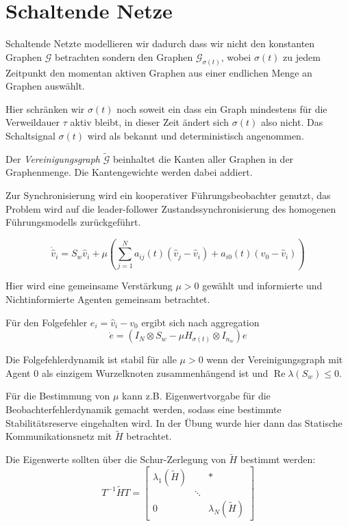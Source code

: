 \pagebreak
\section{Schaltende Netze}

Schaltende Netzte modellieren wir dadurch dass wir nicht den konstanten
Graphen $\mathcal{G}$ betrachten sondern den Graphen $\mathcal{G}_{\sigma(t)}$,
wobei $\sigma(t)$ zu jedem Zeitpunkt den momentan aktiven Graphen
aus einer endlichen Menge an Graphen auswählt.

Hier schränken wir $\sigma(t)$ noch soweit ein dass ein Graph mindestens
für die Verweildauer $\tau$ aktiv bleibt, in dieser Zeit ändert sich
$\sigma(t)$ also nicht.
Das Schaltsignal $\sigma(t)$ wird als bekannt und deterministisch 
angenommen.

Der \emph{Vereinigungsgraph} $\tilde{\mathcal{G}}$ beinhaltet die Kanten
aller Graphen in der Graphenmenge.
Die Kantengewichte werden dabei addiert.

Zur Synchronisierung wird ein kooperativer Führungsbeobachter genutzt,
das Problem wird auf die leader-follower Zustandssynchronisierung
des homogenen Führungsmodells zurückgeführt.

\begin{equation}
    \dot{\hat{v}}_i = S_w \hat{v}_i + \mu \left( \sum_{j=1}^N a_{ij}(t)
    (\hat{v}_j - \hat{v}_i) + a_{i0}(t)(v_0 - \hat{v}_i) \right)   
\end{equation}

Hier wird eine gemeinsame Verstärkung $\mu >0$ gewählt und informierte
und Nichtinformierte Agenten gemeinsam betrachtet.

Für den Folgefehler $e_i = \hat{v}_i - v_0$ ergibt sich nach aggregation
\begin{equation}
    \dot{e} = (I_N \otimes S_w - \mu H_{\sigma(t)} \otimes I_{n_w}) e
\end{equation}

Die Folgefehlerdynamik ist stabil für alle $\mu > 0$ wenn der Vereinigungsgraph
mit Agent 0 als einzigem Wurzelknoten zusammenhängend ist und
$\operatorname{Re}\lambda(S_w) \leq 0$.

Für die Bestimmung von $\mu$ kann z.B. Eigenwertvorgabe für die
Beobachterfehlerdynamik gemacht werden, sodass eine bestimmte
Stabilitätsreserve eingehalten wird.
In der Übung wurde hier dann das Statische Kommunikationsnetz
mit $\tilde{H}$ betrachtet.

Die Eigenwerte sollten über die Schur-Zerlegung von $\tilde{H}$
bestimmt werden:
\begin{equation}
    T^{-1}\tilde{H}T = \begin{bmatrix}
        \lambda_1(\tilde{H}) & &* \\
        & \ddots & \\
        0 & & \lambda_N(\tilde{H})
    \end{bmatrix}
\end{equation}

\begin{equation}
    
\end{equation}
